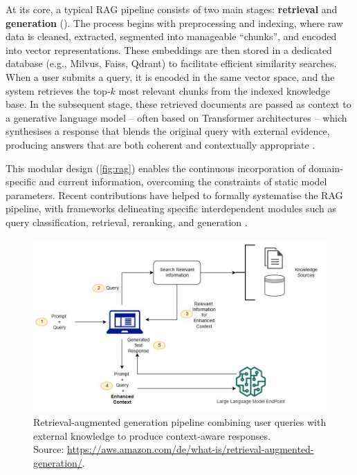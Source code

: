 \begin{spacing}{1.5}
At its core, a typical RAG pipeline consists of two main stages: \textbf{retrieval} and \textbf{generation} (\cite{odsc-community_retrieval-augmented_2024}). The process begins with preprocessing and indexing, where raw data is cleaned, extracted, segmented into manageable ``chunks'', and encoded into vector representations. These embeddings are then stored in a dedicated database (e.g., Milvus, Faiss, Qdrant) to facilitate efficient similarity searches. When a user submits a query, it is encoded in the same vector space, and the system retrieves the top-$k$ most relevant chunks from the indexed knowledge base. In the subsequent stage, these retrieved documents are passed as context to a generative language model -- often based on Transformer architectures \citep{vaswani_attention_2017} -- which synthesises a response that blends the original query with external evidence, producing answers that are both coherent and contextually appropriate \citep{arslan_survey_2024}.

This modular design (\autoref{fig:rag}) enables the continuous incorporation of domain-specific and current information, overcoming the constraints of static model parameters. Recent contributions have helped to formally systematise the RAG pipeline, with frameworks delineating specific interdependent modules such as query classification, retrieval, reranking, and generation \parencite{wang_searching_2024,gao_retrieval-augmented_2024}.

\begin{figure}[H]
  \centering
  \includegraphics[width=\textwidth]{images/rag_workflow.jpg} 
  \caption{Retrieval-augmented generation pipeline combining user queries with external knowledge to produce context-aware responses.\\
  \footnotesize{Source: \url{https://aws.amazon.com/de/what-is/retrieval-augmented-generation/}.\nocite{noauthor_was_nodate}}}
  \label{fig:rag}
\end{figure}


\end{spacing}

